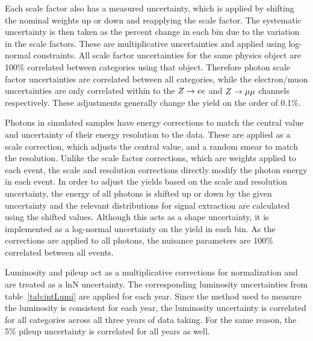 Each scale factor also has a measured uncertainty, which is applied by shifting the nominal weights up or down and reapplying the scale factor. The systematic uncertainty is then taken as the percent change in each bin due to the variation in the scale factors. These are multiplicative uncertainties and applied using log-normal constraints. All scale factor uncertainties for the same physics object are 100\% correlated between categories using that object. Therefore photon scale factor uncertainties are correlated between all categories, while the electron/muon uncertainties are only correlated within to the $Z\to ee$ and $Z\to\mu\mu$ channels respectively. These adjustments generally change the yield on the order of 0.1\%.

Photons in simulated samples have energy corrections to match the central value and uncertainty of their energy resolution to the data. These are applied as a scale correction, which adjusts the central value, and a random smear to match the resolution. Unlike the scale factor corrections, which are weights applied to each event, the scale and resolution corrections directly modify the photon energy in each event. In order to adjust the yields based on the scale and resolution uncertainty, the energy of all photons is shifted up or down by the given uncertainty and the relevant distributions for signal extraction are calculated using the shifted values. Although this acts as a shape uncertainty, it is implemented as a log-normal uncertainty on the yield in each bin. As the corrections are applied to all photons, the nuisance parameters are 100\% correlated between all events.

Luminosity and pileup act as a multiplicative corrections for normalization and are treated as a lnN uncertainty. The corresponding luminosity uncertainties from table~\ref{tab:intLumi} are applied for each year. Since the method used to measure the luminosity is consistent for each year, the luminosity uncertainty is correlated for all categories across all three years of data taking. For the same reason, the 5\% pileup uncertainty is correlated for all years as well.

